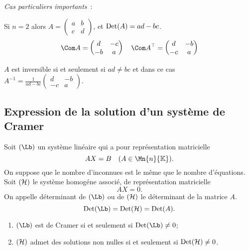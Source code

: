 \emph{Cas particuliers importants}~:

Si $n=2$ alors $A=\begin{pmatrix} a & b \\ c & d \end{pmatrix}$, et $\operatorname{Det}(A)=ad-bc$.
\begin{equation}
  \Com A = \begin{pmatrix} d & -c \\ -b & a \end{pmatrix} \quad   {\Com A}^{\top} = \begin{pmatrix} d & -b \\ -c & a \end{pmatrix}
\end{equation}

$A$ est inversible si et seulement si $ad \neq bc$ et dans ce cas $A^{-1} = \frac{1}{ad-bc} \begin{pmatrix} d & -b \\ -c & a \end{pmatrix}$.

\subsection{Expression de la solution d'un système de Cramer}

Soit $(\Lb)$ un système linéaire qui a pour représentation matricielle
\begin{equation}
  AX=B \quad (A \in \Mn{n}{\K}).
\end{equation}
On suppose que le nombre d'inconnues est le même que le nombre d'équations. Soit $(\mathcal{H})$ le système homogéne associé, de représentation matricielle
\begin{equation}
  AX=0.
\end{equation}
On appelle déterminant de $(\Lb)$ ou de $(\mathcal{H})$ le déterminant de la matrice $A$.
\begin{equation}
  \Det(\Lb)=\Det(\H)=\Det(A).
\end{equation}

\begin{prop}
  \begin{enumerate}
  \item $(\Lb)$ est de Cramer si et seulement si $\Det(\Lb) \neq 0$;
  \item $(\mathcal{H})$ admet des solutions non nulles si et seulement si $\operatorname{Det}(\mathcal{H}) \neq 0$.
  \end{enumerate}
\end{prop}

